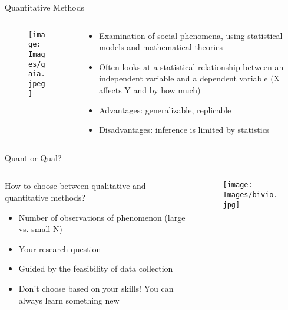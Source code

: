 \documentclass[10pt, aspectratio=169]{beamer}
\begin{document}
\begin{frame}{Quantitative Methods}
\begin{columns}[T]
\begin{column}{0.4\textwidth}
\begin{figure}
    \centering
    \texttt{[image: Images/gaia.jpeg]}
    \label{fig:enter-label}
\end{figure}
\end{column}

\begin{column}{0.6\textwidth}
\begin{itemize}
    \item Examination of social phenomena, using statistical models and mathematical theories \vspace{0.3cm}
    \item Often looks at a statistical relationship between an independent variable and a dependent variable (X affects Y and by how much) \vspace{0.3cm}
    \item Advantages: generalizable, replicable \vspace{0.3cm}
    \item Disadvantages: inference is limited by statistics \vspace{0.3cm}
\end{itemize}
\end{column}
\end{columns}
\end{frame}

\begin{frame}{Quant or Qual?}
\begin{columns}[T]
\begin{column}{0.5\textwidth}
How to choose between qualitative and quantitative methods? \vspace{0.3cm}
\begin{itemize}
    \item Number of observations of phenomenon (large vs. small N)\vspace{0.3cm}
    \item Your research question\vspace{0.3cm}
    \item Guided by the feasibility of data collection \vspace{0.3cm}
    \item Don't choose based on your skills! You can always learn something new
\end{itemize}
\end{column}

\begin{column}{0.5\textwidth}
\begin{figure}
    \centering
    \texttt{[image: Images/bivio.jpg]}
    \label{fig:enter-label}
\end{figure}
\end{column}
\end{columns}
\end{frame}
\end{document}
